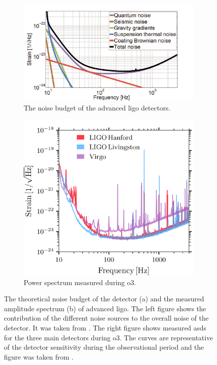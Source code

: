 \begin{figure}
	\centering
	\begin{subfigure}[b]{.56\linewidth}
		\includegraphics[width=\linewidth]{chapters/foundations/sections/cbc_searches/images/noise_limits_aligo.png}
		\caption{The noise budget of the advanced \acrshort{ligo} detectors.}\label{fig:noise_limit}
	\end{subfigure}
	\hspace{0.03\linewidth}
	\begin{subfigure}[b]{.34\linewidth}
		\includegraphics[width=\linewidth]{chapters/foundations/sections/cbc_searches/images/noise_o3_2.png}
		\caption{Power spectrum measured during \acrshort{o3}.}\label{fig:noise_o3}
	\end{subfigure}
	\caption[Noise amplitude spectrum]{The theoretical noise budget of the detector (a) and the measured amplitude spectrum (b) of advanced \acrshort{ligo}. The left figure shows the contribution of the different noise sources to the overall noise of the detector. It was taken from \cite{LIGOScientific:2014pky}. The right figure shows measured \acrshort{asd}s for the three main detectors during \acrshort{o3}. The curves are representative of the detector sensitivity during the observational period and the figure was taken from \cite{LIGOScientific:2021djp}.}
\end{figure}

